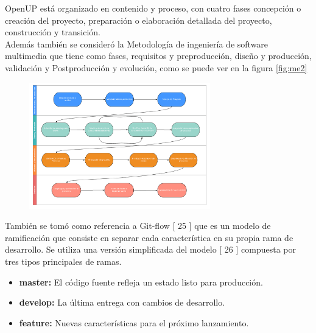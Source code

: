 OpenUP está organizado en contenido y proceso, con cuatro fases concepción o creación del proyecto, preparación o elaboración detallada del proyecto, construcción y transición.\\

Además también se consideró la Metodología de ingeniería de software multimedia que tiene como fases, requisitos y preproducción, diseño y producción, validación y Postproducción y evolución, como se puede ver en la figura \ref{fig:me2}

\begin{figure}[H]
	\begin{center}
 		\includegraphics[width = 0.7\textwidth]{source/images/image50.png}
	\end{center} 
\end{figure}

También se tomó como referencia a Git-flow [ 25 ] que es un modelo de ramificación que consiste en separar cada característica en su propia rama de desarrollo. Se utiliza una versión simplificada del modelo [ 26 ] compuesta por tres tipos principales de ramas.\\
\begin{itemize}
\item \textbf{master:} El código fuente refleja un estado listo para producción.
\item \textbf{develop:} La última entrega con cambios de desarrollo.
\item \textbf{feature:} Nuevas características para el próximo lanzamiento.
\end{itemize}

